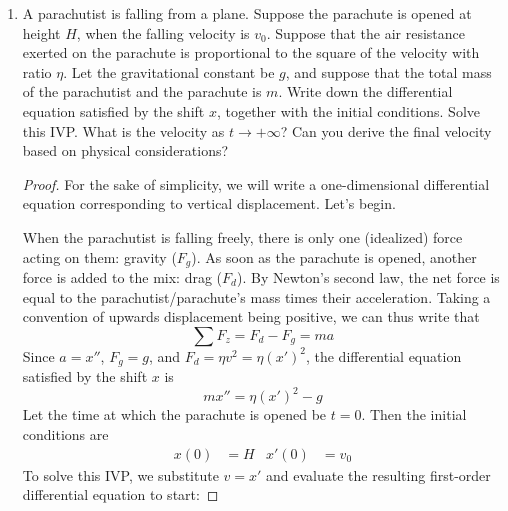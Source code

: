 \documentclass[../psets.tex]{subfiles}
\begin{document}
\begin{enumerate}
\begin{proof}
        The amount of time it takes for the capacitor to charge to 98\% under the given conditions ($R=\SI{e3}{\ohm}$ and $C=\SI{e-6}{\farad}$) may be determined as follows.
        \begin{align*}
            0.98 &= 1-\e[-t/RC]\\
            t &= -RC\ln(0.02)\\
            \Aboxed{t &= \SI{3.9e-3}{\second}}
        \end{align*}
    \end{proof}
    \item A parachutist is falling from a plane. Suppose the parachute is opened at height $H$, when the falling velocity is $v_0$. Suppose that the air resistance exerted on the parachute is proportional to the square of the velocity with ratio $\eta$. Let the gravitational constant be $g$, and suppose that the total mass of the parachutist and the parachute is $m$. Write down the differential equation satisfied by the shift $x$, together with the initial conditions. Solve this IVP. What is the velocity as $t\to +\infty$? Can you derive the final velocity based on physical considerations?
    \begin{proof}
        For the sake of simplicity, we will write a one-dimensional differential equation corresponding to vertical displacement. Let's begin.\par
        When the parachutist is falling freely, there is only one (idealized) force acting on them: gravity ($F_g$). As soon as the parachute is opened, another force is added to the mix: drag ($F_d$). By Newton's second law, the net force is equal to the parachutist/parachute's mass times their acceleration. Taking a convention of upwards displacement being positive, we can thus write that
        \begin{equation*}
            \sum F_z = F_d-F_g = ma
        \end{equation*}
        Since $a=x''$, $F_g=g$, and $F_d=\eta v^2=\eta(x')^2$, the differential equation satisfied by the shift $x$ is
        \begin{equation*}
            mx'' = \eta(x')^2-g
        \end{equation*}
        Let the time at which the parachute is opened be $t=0$. Then the initial conditions are
        \begin{align*}
            x(0) &= H&
            x'(0) &= v_0
        \end{align*}
        To solve this IVP, we substitute $v=x'$ and evaluate the resulting first-order differential equation to start:

\end{proof}
\end{enumerate}
\end{document}
